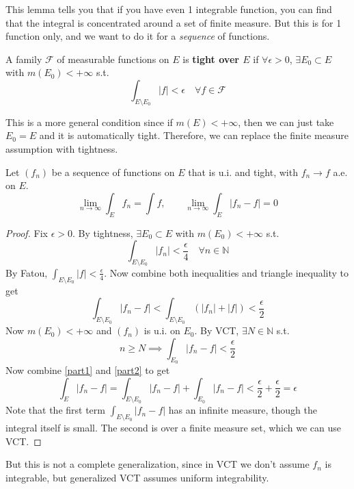   This lemma tells you that if you have even 1 integrable function, you can find that the integral is concentrated around a set of finite measure. But this is for 1 function only, and we want to do it for a \textit{sequence} of functions. 

  \begin{definition}[Tight]
    A family $\mathscr{F}$ of measurable functions on $E$ is \textbf{tight over $E$} if $\forall \epsilon > 0$, $\exists E_0 \subset E$ with $m(E_0) < +\infty$ s.t. 
    \begin{equation}
      \int_{E \setminus E_0} |f| < \epsilon \quad \forall f \in \mathscr{F}
    \end{equation}
  \end{definition}

  This is a more general condition since if $m(E) < +\infty$, then we can just take $E_0 = E$ and it is automatically tight. Therefore, we can replace the finite measure assumption with tightness. 

  \begin{theorem}
    Let $(f_n)$ be a sequence of functions on $E$ that is u.i. and tight, with $f_n \to f$ a.e. on $E$. 
    \begin{equation}
      \lim_{n \to \infty} \int_E f_n = \int f, \qquad \lim_{n \to \infty} \int_E |f_n - f| = 0
    \end{equation}
  \end{theorem}
  \begin{proof}
    Fix $\epsilon > 0$. By tightness, $\exists E_0 \subset E$ with $m(E_0) < +\infty$ s.t. 
    \begin{equation}
      \int_{E \setminus E_0} |f_n| < \frac{\epsilon}{4} \quad \forall n \in \mathbb{N}
    \end{equation}
    By Fatou, $\int_{E \setminus E_0} |f| < \frac{\epsilon}{4}$. Now combine both inequalities and triangle inequality to get 
    \begin{equation}
      \int_{E \setminus E_0} |f_n - f| < \int_{E \setminus E_0} (|f_n| + |f|) < \frac{\epsilon}{2} \label{part1}
    \end{equation}
    Now $m(E_0) < +\infty$ and $(f_n)$ is u.i. on $E_0$. By VCT, $\exists N \in \mathbb{N}$ s.t. 
    \begin{equation}
      n \geq N \implies \int_{E_0}  |f_n - f| < \frac{\epsilon}{2} \label{part2}
    \end{equation}
    Now combine \ref{part1} and \ref{part2} to get 
    \begin{equation}
      \int_{E} |f_n - f| = \int_{E \setminus E_0} |f_n - f| + \int_{E_0} |f_n - f| < \frac{\epsilon}{2} + \frac{\epsilon}{2} = \epsilon
    \end{equation}
    Note that the first term $\int_{E \setminus E_0} |f_n - f|$ has an infinite measure, though the integral itself is small. The second is over a finite measure set, which we can use VCT. 
  \end{proof}

  But this is not a complete generalization, since in VCT we don't assume $f_n$ is integrable, but generalized VCT assumes uniform integrability. 


